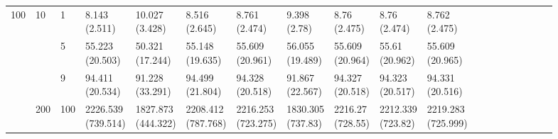 \documentclass[12pt,a4paper]{article}
\begin{document}
\begin{landscape}
\begin{longtable}{lllllllllllrrrrrrrr}
\midrule
\multirow[t]{9}{*}{100} & \multirow[t]{3}{*}{10} & 1 & \makecell{8.143 \\ (2.511)} & \makecell{10.027 \\ (3.428)} & \makecell{8.516 \\ (2.645)} & \makecell{8.761 \\ (2.474)} & \makecell{9.398 \\ (2.78)} & \makecell{8.76 \\ (2.475)} & \makecell{8.76 \\ (2.474)} & \makecell{8.762 \\ (2.475)} \\
 &  & 5 & \makecell{55.223 \\ (20.503)} & \makecell{50.321 \\ (17.244)} & \makecell{55.148 \\ (19.635)} & \makecell{55.609 \\ (20.961)} & \makecell{56.055 \\ (19.489)} & \makecell{55.609 \\ (20.964)} & \makecell{55.61 \\ (20.962)} & \makecell{55.609 \\ (20.965)}  \\
 &  & 9 & \makecell{94.411 \\ (20.534)} & \makecell{91.228 \\ (33.291)} & \makecell{94.499 \\ (21.804)} & \makecell{94.328 \\ (20.518)} & \makecell{91.867 \\ (22.567)} & \makecell{94.327 \\ (20.518)} & \makecell{94.323 \\ (20.517)} & \makecell{94.331 \\ (20.516)} \\
\cline{2-19}
 & \multirow[t]{3}{*}{200} & 100 & \makecell{2226.539 \\ (739.514)} & \makecell{1827.873 \\ (444.322)} & \makecell{2208.412 \\ (787.768)} & \makecell{2216.253 \\ (723.275)} & \makecell{1830.305 \\ (737.83)} & \makecell{2216.27 \\ (728.55)} & \makecell{2212.339 \\ (723.82)} & \makecell{2219.283 \\ (725.999)}  \\

\end{longtable}
\end{landscape}
\end{document}
